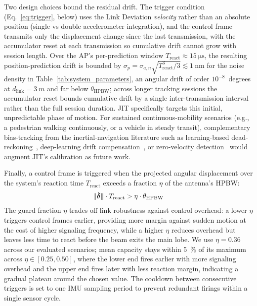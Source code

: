 \documentclass[fleqn,10pt]{wlscirep}
\newcommand{\rev}[1]{{\color{revblue}#1}}
\begin{document}
\rev{Two design choices bound the residual drift. The trigger condition (Eq.~\ref{eq:trigger}, below) uses the Link Deviation \emph{velocity} rather than an absolute position (single vs double accelerometer integration), and the control frame transmits only the displacement change since the last transmission, with the accumulator reset at each transmission so cumulative drift cannot grow with session length. Over the AP's per-prediction window $T_{\text{react}} \approx \SI{15}{\micro\second}$, the resulting position-prediction drift is bounded by $\sigma_{p} = \sigma_{a,n}\sqrt{T_{\text{react}}^{3}/3} \lesssim \SI{1}{\nano\meter}$ for the noise density in Table~\ref{tab:system_parameters}, an angular drift of order $10^{-8}$~degrees at $d_{\text{link}} = \SI{3}{m}$ and far below $\theta_{\text{HPBW}}$; across longer tracking sessions the accumulator reset bounds cumulative drift by a single inter-transmission interval rather than the full session duration. JIT specifically targets this initial, unpredictable phase of motion. For sustained continuous-mobility scenarios (e.g., a pedestrian walking continuously, or a vehicle in steady transit), complementary bias-tracking from the inertial-navigation literature such as learning-based dead-reckoning~\cite{Brossard2020AIIMU}, deep-learning drift compensation~\cite{Chen2024DLInertial}, or zero-velocity detection~\cite{Skog2010ZUPT} would augment JIT's calibration as future work.}

Finally, a control frame is triggered when the projected angular displacement over the system's reaction time $T_{\text{react}}$ exceeds a fraction $\eta$ of the antenna's HPBW:
\begin{equation}
    \|\dot{\boldsymbol{\delta}}\| \cdot T_{\text{react}} > \eta \cdot \theta_{\text{HPBW}}
    \rev{\label{eq:trigger}}
\end{equation}
The guard fraction $\eta$ trades off link robustness against control overhead: a lower $\eta$ triggers control frames earlier, providing more margin against sudden motion at the cost of higher signaling frequency, while a higher $\eta$ reduces overhead but leaves less time to react before the beam exits the main lobe. We use $\eta = 0.36$ across our evaluated scenarios; \rev{mean capacity stays within \SI{5}{\percent} of its maximum across $\eta \in [0.25, 0.50]$, where the lower end fires earlier with more signaling overhead and the upper end fires later with less reaction margin, indicating a gradual plateau around the chosen value. The cooldown between consecutive triggers is set to one IMU sampling period to prevent redundant firings within a single sensor cycle.}
\end{document}
